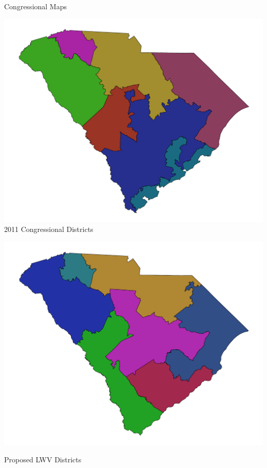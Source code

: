 \documentclass[xcolor=dvipsnames,table]{beamer}
\theoremstyle{plain}
\theoremstyle{definition}
\begin{document}
\begin{frame}{Congressional Maps}

\begin{minipage}{0.5\textwidth}
\hspace{-13mm}\includegraphics[scale=.43]{Congress2011.pdf}
2011 Congressional Districts
\end{minipage}%
\begin{minipage}{0.5\textwidth}
\hspace{-5mm}\includegraphics[scale=0.38]{Congress2021.pdf}

\vspace{-4mm}

\hspace{10mm}Proposed LWV Districts
\end{minipage}
\end{frame}
\end{document}
